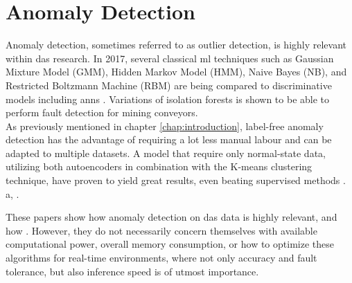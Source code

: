 \section{Anomaly Detection}
\label{relwork:anomaly}


Anomaly detection, sometimes referred to as outlier detection, is highly relevant within \acrshort{das} research. In 2017, several classical \acrshort{ml} techniques such as Gaussian Mixture Model (GMM), Hidden Markov Model (HMM), Naive Bayes (NB), and Restricted Boltzmann Machine (RBM) are being compared to discriminative models including \acrshort{ann}s \cite{app7080841}. Variations of isolation forests is shown to be able to perform fault detection for mining conveyors\cite{WIJAYA2022110330}. \\

As previously mentioned in chapter \ref{chap:introduction}, label-free anomaly detection has the advantage of requiring a lot less manual labour and can be adapted to multiple datasets. A model that require only normal-state data, utilizing both autoencoders in combination with the K-means clustering technique, have proven to yield great results, even beating supervised methods \cite{s23084094}. \\ 

a, \cite{10.14778/3538598.3538602} \cite{10.1145/3444690}.

These papers show how anomaly detection on \acrshort{das} data is highly relevant, and how . However, they do not necessarily concern themselves with available computational power, overall memory consumption, or how to optimize these algorithms for real-time environments, where not only accuracy and fault tolerance, but also inference speed is of utmost importance.